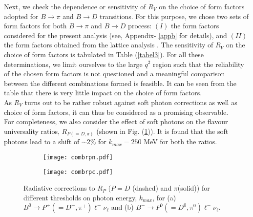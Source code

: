 \documentclass[a4paper,11pt]{article}
\begin{document}
	Next, we check the dependence or sensitivity of $R_V$ on the choice of form factors adopted for $B\to \pi$ and $B\to D$
	transitions. For this purpose, we chose two sets of form factors for both $B\to \pi$ and $B\to D$ process: 
	$(I)$ the form factors considered for the present analysis (see, Appendix- \ref{appb} for details),
	and $(II)$ the form factors obtained from the lattice analysis \cite{Aoki:2021kgd}. The sensitivity of $R_V$ on the choice of 
	form factors is tabulated in Table (\ref{tabel3}). For all these determinations,
	we limit ourselves to the large $q^2$ region such that the reliability of the chosen form factors is not questioned and a meaningful
	comparison between the different combinations formed is feasible. It can be seen from the table that there is very little impact on
	the choice of form factors. \\
	As $R_V$ turns out to be rather robust against soft photon corrections as well as choice of form factors, 
	it can thus be considered as a promising observable.\\
For completeness, we also consider the effect of soft photons on the flavour universality ratios, $R_{P(=D,\pi)}$ (shown in Fig. (\ref{fig7})). It is found that the soft photons lead to a shift of $\sim 2\%$ for $k_{max}= 250$ MeV for both the ratios. 
       \begin{figure}[h]
	 	\begin{subfigure}{.5\textwidth}
	 		\centering
	 		\texttt{[image: combrpn.pdf]}
	 		\caption{}
	 	\end{subfigure}%
	 	\begin{subfigure}{.5\textwidth}
	 		\centering
	 		\texttt{[image: combrpc.pdf]}
	 		\caption{}
	 	\end{subfigure}
	 	\caption{Radiative corrections to $R_{P}$ ($P=D$ (dashed) and $\pi$(solid)) for different thresholds on photon energy, $k_{max}$, for (a) $B^0 \rightarrow P^+(=D^+,\pi^+) \ell^- \nu_\ell$ and (b) $B^- \rightarrow P^0(=D^0,\pi^0) \ell^- \nu_\ell$. }
	 	\label{fig7}
	 \end{figure} 
\end{document}
